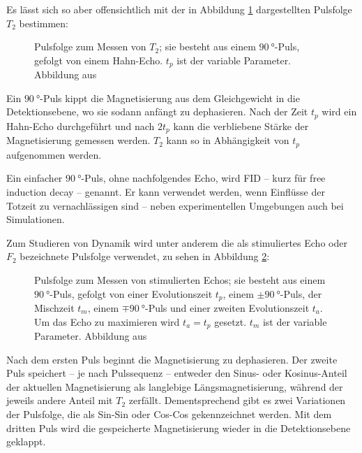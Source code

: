 Es lässt sich so aber offensichtlich mit der in Abbildung \ref{fig:theo:pulsT2} dargestellten Pulsfolge $T_2$ bestimmen:
\begin{figure}
	\begin{center}
		
	\end{center}
	\caption{Pulsfolge zum Messen von $T_2$; sie besteht aus einem $\SI{90}{\degree}$-Puls, gefolgt von einem Hahn-Echo. $t_p$ ist der variable Parameter. Abbildung aus \cite{joachim_master}}\label{fig:theo:pulsT2}
\end{figure}
Ein $\SI{90}{\degree}$-Puls kippt die Magnetisierung aus dem Gleichgewicht in die Detektionsebene, wo sie sodann anfängt zu dephasieren. Nach der Zeit $t_p$ wird ein Hahn-Echo durchgeführt und nach $2 t_p$ kann die verbliebene Stärke der Magnetisierung gemessen werden. $T_2$ kann so in Abhängigkeit von $t_p$ aufgenommen werden.

Ein einfacher $\SI{90}{\degree}$-Puls, ohne nachfolgendes Echo, wird FID -- kurz für free induction decay -- genannt. Er kann verwendet werden, wenn Einflüsse der Totzeit zu vernachlässigen sind -- neben experimentellen Umgebungen auch bei Simulationen.

Zum Studieren von Dynamik wird unter anderem die als stimuliertes Echo oder $F_2$ bezeichnete Pulsfolge verwendet, zu sehen in Abbildung \ref{fig:theo:pulsF2}:
\begin{figure}
	\begin{center}
		
	\end{center}
	\caption{Pulsfolge zum Messen von stimulierten Echos; sie besteht aus einem $\SI{90}{\degree}$-Puls, gefolgt von einer Evolutionszeit $t_p$, einem $\pm \SI{90}{\degree}$-Puls, der Mischzeit $t_m$, einem $\mp \SI{90}{\degree}$-Puls und einer zweiten Evolutionszeit $t_a$. Um das Echo zu maximieren wird $t_a = t_p$ gesetzt. $t_m$ ist der variable Parameter. Abbildung aus \cite{joachim_master}}\label{fig:theo:pulsF2}
\end{figure}

Nach dem ersten Puls beginnt die Magnetisierung zu dephasieren. Der zweite Puls speichert -- je nach Pulssequenz -- entweder den Sinus- oder Kosinus-Anteil der aktuellen Magnetisierung als langlebige Längsmagnetisierung, während der jeweils andere Anteil mit $T_2$ zerfällt. Dementsprechend gibt es zwei Variationen der Pulsfolge, die als Sin-Sin oder Cos-Cos gekennzeichnet werden. Mit dem dritten Puls wird die gespeicherte Magnetisierung wieder in die Detektionsebene geklappt. 

